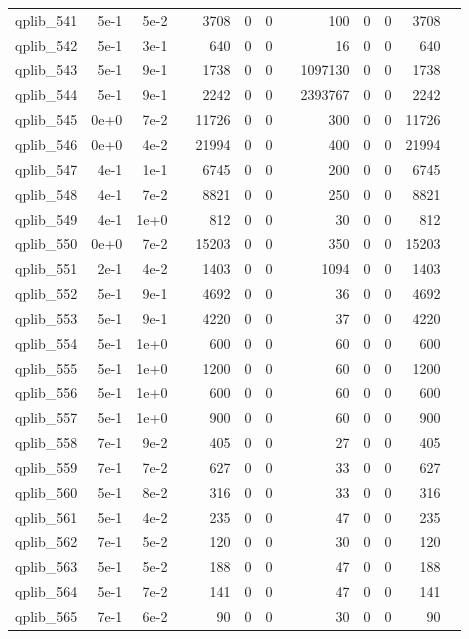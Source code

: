 \begin{table}
\begin{tabular}{lrrrrrrrrrrrr}
			qplib\_541	&	5e-1	&	5e-2	&	&	3708	&	0	&	0	&	&	100	&	0	&	0	&	3708	\\
qplib\_542	&	5e-1	&	3e-1	&	&	640	&	0	&	0	&	&	16	&	0	&	0	&	640	\\
qplib\_543	&	5e-1	&	9e-1	&	&	1738	&	0	&	0	&	&	1097130	&	0	&	0	&	1738	\\
qplib\_544	&	5e-1	&	9e-1	&	&	2242	&	0	&	0	&	&	2393767	&	0	&	0	&	2242	\\
qplib\_545	&	0e+0	&	7e-2	&	&	11726	&	0	&	0	&	&	300	&	0	&	0	&	11726	\\
qplib\_546	&	0e+0	&	4e-2	&	&	21994	&	0	&	0	&	&	400	&	0	&	0	&	21994	\\
qplib\_547	&	4e-1	&	1e-1	&	&	6745	&	0	&	0	&	&	200	&	0	&	0	&	6745	\\
qplib\_548	&	4e-1	&	7e-2	&	&	8821	&	0	&	0	&	&	250	&	0	&	0	&	8821	\\
qplib\_549	&	4e-1	&	1e+0	&	&	812	&	0	&	0	&	&	30	&	0	&	0	&	812	\\
qplib\_550	&	0e+0	&	7e-2	&	&	15203	&	0	&	0	&	&	350	&	0	&	0	&	15203	\\
qplib\_551	&	2e-1	&	4e-2	&	&	1403	&	0	&	0	&	&	1094	&	0	&	0	&	1403	\\
qplib\_552	&	5e-1	&	9e-1	&	&	4692	&	0	&	0	&	&	36	&	0	&	0	&	4692	\\
qplib\_553	&	5e-1	&	9e-1	&	&	4220	&	0	&	0	&	&	37	&	0	&	0	&	4220	\\
qplib\_554	&	5e-1	&	1e+0	&	&	600	&	0	&	0	&	&	60	&	0	&	0	&	600	\\
qplib\_555	&	5e-1	&	1e+0	&	&	1200	&	0	&	0	&	&	60	&	0	&	0	&	1200	\\
qplib\_556	&	5e-1	&	1e+0	&	&	600	&	0	&	0	&	&	60	&	0	&	0	&	600	\\
qplib\_557	&	5e-1	&	1e+0	&	&	900	&	0	&	0	&	&	60	&	0	&	0	&	900	\\
qplib\_558	&	7e-1	&	9e-2	&	&	405	&	0	&	0	&	&	27	&	0	&	0	&	405	\\
qplib\_559	&	7e-1	&	7e-2	&	&	627	&	0	&	0	&	&	33	&	0	&	0	&	627	\\
qplib\_560	&	5e-1	&	8e-2	&	&	316	&	0	&	0	&	&	33	&	0	&	0	&	316	\\
qplib\_561	&	5e-1	&	4e-2	&	&	235	&	0	&	0	&	&	47	&	0	&	0	&	235	\\
qplib\_562	&	7e-1	&	5e-2	&	&	120	&	0	&	0	&	&	30	&	0	&	0	&	120	\\
qplib\_563	&	5e-1	&	5e-2	&	&	188	&	0	&	0	&	&	47	&	0	&	0	&	188	\\
qplib\_564	&	5e-1	&	7e-2	&	&	141	&	0	&	0	&	&	47	&	0	&	0	&	141	\\
qplib\_565	&	7e-1	&	6e-2	&	&	90	&	0	&	0	&	&	30	&	0	&	0	&	90	\\

\end{tabular}
\end{table}
